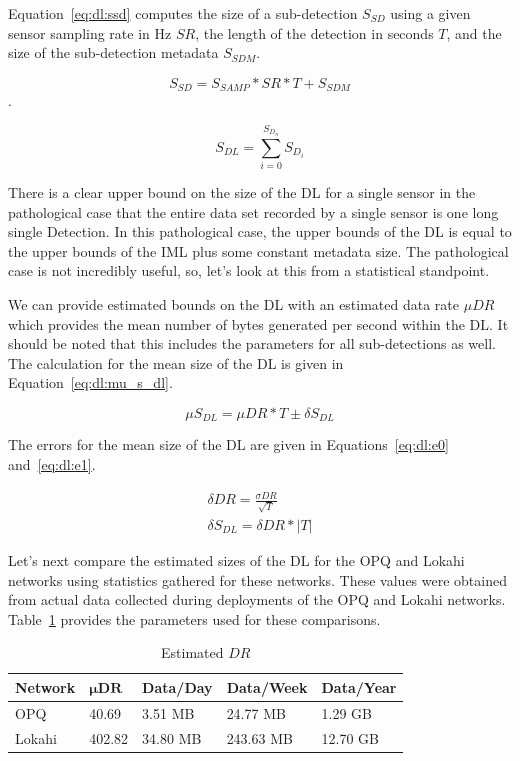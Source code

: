Equation~\ref{eq:dl:ssd} computes the size of a sub-detection $S_{SD}$ using a given sensor sampling rate in Hz $SR$, the length of the detection in seconds $T$, and the size of the sub-detection metadata $S_{SDM}$.

\begin{equation}\label{eq:dl:ssd}
	S_{SD} = S_{SAMP} * SR * T + S_{SDM}
\end{equation}.

\begin{equation}\label{eq:dl:dl}
	S_{DL} = \sum_{i=0}^{S_{D_{n}}} S_{D_{i}}
\end{equation}

There is a clear upper bound on the size of the DL for a single sensor in the pathological case that the entire data set recorded by a single sensor is one long single Detection. In this pathological case, the upper bounds of the DL is equal to the upper bounds of the IML plus some constant metadata size. The pathological case is not incredibly useful, so, let's look at this from a statistical standpoint.

We can provide estimated bounds on the DL with an estimated data rate $\mu DR$ which provides the mean number of bytes generated per second within the DL\@. It should be noted that this includes the parameters for all sub-detections as well. The calculation for the mean size of the DL is given in Equation~\ref{eq:dl:mu_s_dl}.

\begin{equation}\label{eq:dl:mu_s_dl}
	\mu S_{DL} = \mu DR * T \pm \delta S_{DL}
\end{equation}

The errors for the mean size of the DL are given in Equations~\ref{eq:dl:e0} and~\ref{eq:dl:e1}.

\begin{align}
	\delta DR = \frac{\sigma DR}{\sqrt{T}} \label{eq:dl:e0} \\
	\delta S_{DL} = \delta {DR} * |T| \label{eq:dl:e1}
\end{align}

Let's next compare the estimated sizes of the DL for the OPQ and Lokahi networks using statistics gathered for these networks. These values were obtained from actual data collected during deployments of the OPQ and Lokahi networks. Table~\ref{table:estimated_mu_dr} provides the parameters used for these comparisons.

\begin{table}[H]
	\centering
	\caption{Estimated $DR$}
	\begin{tabularx}{\textwidth}{lllll}
		\toprule
		\textbf{Network} & $\bm{\mu DR}$ & \textbf{Data/Day} & \textbf{Data/Week} & \textbf{Data/Year} \\
		\midrule
		OPQ & 40.69 & 3.51 MB & 24.77 MB & 1.29 GB \\
		Lokahi & 402.82 & 34.80 MB & 243.63 MB & 12.70 GB \\
		\bottomrule
	\end{tabularx}
	\label{table:estimated_mu_dr}
\end{table}

